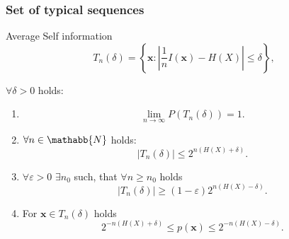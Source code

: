 \documentclass[14pt]{beamer}
\renewcommand{\vec}[1]{\ensuremath{\boldsymbol{#1}}}
\begin{document}
\begin{frame}
\frametitle{Set of typical sequences}
\begin{itemize}
\small{  

    \item Average Self information 
    \begin{equation}\label{def_typ}
    T_n (\delta ) = \left\{ {\vec x:\left| {\frac{1}{n}I(\vec x) -
    H(X)} \right| \le \delta } \right\},
    \end{equation}

    \item 
    \begin{theorem} $\forall \delta > 0$ holds:
    \begin{enumerate}
        \item 
        \[
        \mathop {\lim }\limits_{n \to \infty } P\left( {T_n (\delta )} \right) = 1.
        \]
        
        \item $\forall n \in \mathabb{N}$ holds: 
        \[
        \left| {T_n (\delta )} \right| \le 2^{n(H(X) + \delta )}.
        \]
        
        \item $\forall \varepsilon > 0$ $\exists n_0 $ such, that $\forall n \ge n_0 $ holds 
        \[
        \left| {T_n (\delta )} \right| \ge (1 - \varepsilon )2^{n(H(X) - \delta )}.
        \]
        
        \item For $\vec x \in T_n (\delta)$ holds
        \[
        2^{ - n(H(X) + \delta )} \le p(\vec x) \le 2^{ - n(H(X) - \delta)}.
        \]
        
    \end{enumerate}
    \end{theorem}
}
\end{itemize}
\end{frame}
\end{document}
